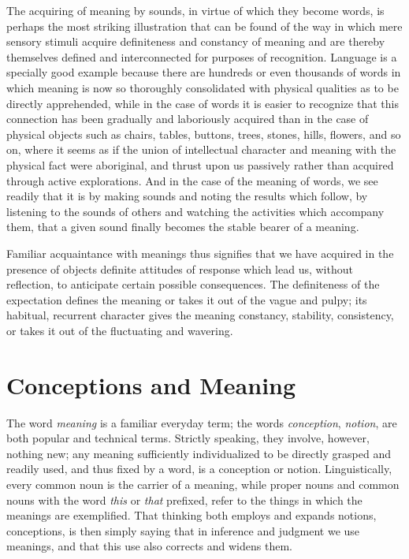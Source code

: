 \documentclass[letterpaper]{book}
\begin{document}

The acquiring of meaning by sounds, in virtue of which they become
words, is perhaps the most striking illustration that can be found of
the way in which mere sensory stimuli acquire definiteness and constancy
of meaning and are thereby themselves defined and interconnected for
purposes of recognition. Language is a specially good example because
there are hundreds or even thousands of words in which meaning is now so
thoroughly consolidated with physical qualities as to be directly
apprehended, while in the case of words it is easier to recognize that
this connection has been gradually and laboriously acquired than in the
case of physical objects such as chairs, tables, buttons, trees, stones,
hills, flowers, and so on, where it seems as if the union of
intellectual character and meaning with the physical fact were
aboriginal, and thrust upon us passively rather than acquired through
active explorations. And in the case of the meaning of words, we see
readily that it is by
making
sounds and noting the results which follow, by listening to the sounds
of others and watching the activities which accompany them, that a given
sound finally becomes the stable bearer of a meaning.


Familiar acquaintance with meanings thus signifies that we have acquired
in the presence of objects definite attitudes of response which lead us,
without reflection, to anticipate certain possible consequences. The
definiteness of the expectation defines the meaning or takes it out of
the vague and pulpy; its habitual, recurrent character gives the meaning
constancy, stability, consistency, or takes it out of the fluctuating
and wavering.

\section{Conceptions and Meaning}


The word \emph{meaning} is a familiar everyday term; the words
\emph{conception}, \emph{notion}, are both popular and technical terms.
Strictly speaking, they involve, however, nothing new; any meaning
sufficiently individualized to be directly grasped and readily used, and
thus fixed by a word, is a conception or notion. Linguistically, every
common noun is the carrier of a meaning, while proper nouns and common
nouns with the word \emph{this} or \emph{that} prefixed, refer to the
things in which the meanings are exemplified. That thinking both employs
and expands notions, conceptions, is then simply saying that in
inference and judgment we use meanings, and that this use also corrects
and widens them.
\end{document}

